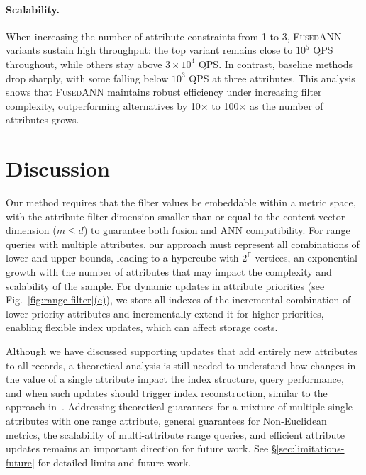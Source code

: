 \documentclass[numbers,sort]{article}
\begin{document}
\paragraph{Scalability.}{When increasing the number of attribute constraints from 1 to 3, \textsc{FusedANN} variants sustain high throughput: the top variant remains close to $10^5$ QPS throughout, while others stay above $3 \times 10^4$ QPS. In contrast, baseline methods drop sharply, with some falling below $10^3$ QPS at three attributes. This analysis shows that \textsc{FusedANN} maintains robust efficiency under increasing filter complexity, outperforming alternatives by 10$\times$ to 100$\times$ as the number of attributes grows.}
\section{Discussion}
\label{sec:disscusion}
Our method requires that the filter values be embeddable within a metric space, with the attribute filter dimension smaller than or equal to the content vector dimension ($m\le d$) to guarantee both fusion and ANN compatibility. For range queries with multiple attributes, our approach must represent all combinations of lower and upper bounds, leading to a hypercube with $2^{\mathbb{F}}$ vertices, an exponential growth with the number of attributes that may impact the complexity and scalability of the sample. For dynamic updates in attribute priorities (see Fig.~\hyperref[fig:range-filter]{\ref*{fig:range-filter}(c)}), we store all indexes of the incremental combination of lower-priority attributes and incrementally extend it for higher priorities, enabling flexible index updates, which can affect storage costs.

Although we have discussed supporting updates that add entirely new attributes to all records, a theoretical analysis is still needed to understand how changes in the value of a single attribute impact the index structure, query performance, and when such updates should trigger index reconstruction, similar to the approach in~\cite{mohoney2024incremental}. Addressing theoretical guarantees for a mixture of multiple single attributes with one range attribute, general guarantees for Non-Euclidean metrics, the scalability of multi-attribute range queries, and efficient attribute updates remains an important direction for future work. See \hyperref[sec:limitations-future]{\S\ref*{sec:limitations-future}} for detailed limits and future work.
\end{document}
